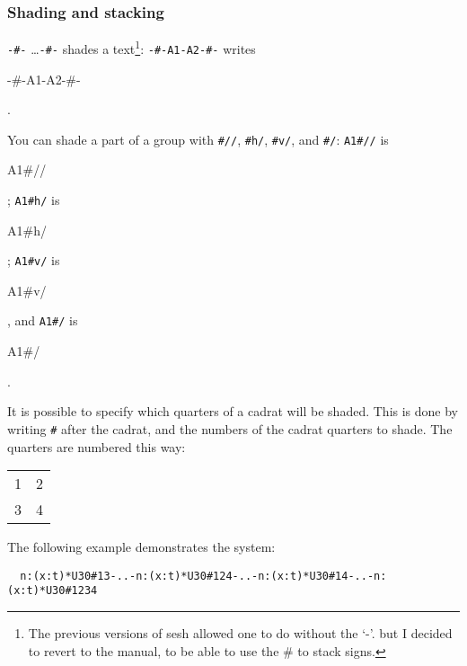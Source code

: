\documentclass[final]{article}
\begin{document}
\subsubsection{Shading and stacking}

\verb|-#-| \ldots \verb|-#-| shades a text\footnote{The previous
  versions of sesh allowed one to do without the `-'. but I decided to
  revert to the manual, to be able to use the \# to stack signs.}:
\verb/-#-A1-A2-#-/ writes 
\begin{hieroglyph}
  -#-A1-A2-#-
\end{hieroglyph}.

You can shade a part of a group with \verb.#//., 
\verb.#h/., \verb.#v/., and \verb.#/.:
\verb.A1#//. is 
\begin{hieroglyph}
  A1#//
\end{hieroglyph}; 
\verb.A1#h/. is 
\begin{hieroglyph}
  A1#h/
\end{hieroglyph}; 
\verb.A1#v/. is 
\begin{hieroglyph}
  A1#v/
\end{hieroglyph}, and 
\verb.A1#/. is 
\begin{hieroglyph}
  A1#/
\end{hieroglyph}.

It is possible to specify which quarters of a cadrat will be shaded.
This is done by writing \verb|#| after the cadrat, and the numbers of
the cadrat quarters to shade. The quarters are numbered this way:
\begin{center}
  \begin{tabular}{cc}
    1 & 2 \\
    3 & 4\\
  \end{tabular}
\end{center}
The following example demonstrates the system:
\begin{verbatim}
  n:(x:t)*U30#13-..-n:(x:t)*U30#124-..-n:(x:t)*U30#14-..-n:(x:t)*U30#1234
\end{verbatim}

\end{document}
